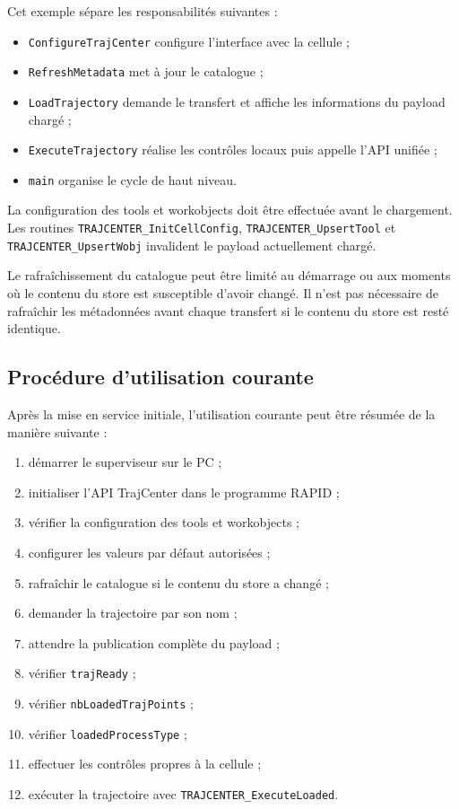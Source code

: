 \documentclass{rapportENSAM}
\begin{document}
Cet exemple sépare les responsabilités suivantes :

\begin{itemize}
    \item \texttt{ConfigureTrajCenter} configure l'interface avec la cellule ;
    \item \texttt{RefreshMetadata} met à jour le catalogue ;
    \item \texttt{LoadTrajectory} demande le transfert et affiche les
    informations du payload chargé ;
    \item \texttt{ExecuteTrajectory} réalise les contrôles locaux puis appelle
    l'API unifiée ;
    \item \texttt{main} organise le cycle de haut niveau.
\end{itemize}

La configuration des tools et workobjects doit être effectuée avant le
chargement. Les routines \texttt{TRAJCENTER\_InitCellConfig},
\texttt{TRAJCENTER\_UpsertTool} et
\texttt{TRAJCENTER\_UpsertWobj} invalident le payload actuellement chargé.

Le rafraîchissement du catalogue peut être limité au démarrage ou aux moments
où le contenu du store est susceptible d'avoir changé. Il n'est pas nécessaire
de rafraîchir les métadonnées avant chaque transfert si le contenu du store est
resté identique.


\subsection{Procédure d'utilisation courante}
\label{subsec:rapid-daily-operation}

Après la mise en service initiale, l'utilisation courante peut être résumée de
la manière suivante :

\begin{enumerate}
    \item démarrer le superviseur sur le PC ;
    \item initialiser l'API TrajCenter dans le programme RAPID ;
    \item vérifier la configuration des tools et workobjects ;
    \item configurer les valeurs par défaut autorisées ;
    \item rafraîchir le catalogue si le contenu du store a changé ;
    \item demander la trajectoire par son nom ;
    \item attendre la publication complète du payload ;
    \item vérifier \texttt{trajReady} ;
    \item vérifier \texttt{nbLoadedTrajPoints} ;
    \item vérifier \texttt{loadedProcessType} ;
    \item effectuer les contrôles propres à la cellule ;
    \item exécuter la trajectoire avec
    \texttt{TRAJCENTER\_ExecuteLoaded}.
\end{enumerate}
\end{document}
